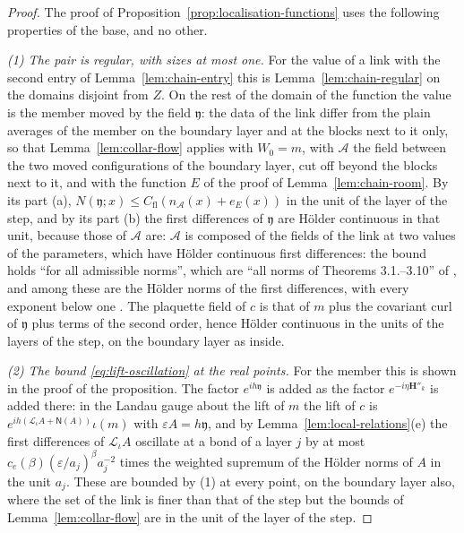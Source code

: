 \begin{proof}
The proof of Proposition~\ref{prop:localisation-functions} uses the following properties of the base, and no other.

\emph{(1) The pair is regular, with sizes at most one.} For the value of a link with the second entry of Lemma~\ref{lem:chain-entry} this is Lemma~\ref{lem:chain-regular} on the domains disjoint from $Z$. On the rest of the domain of the function the value is the member moved by the field $\mathfrak y$: the data of the link differ from the plain averages of the member on the boundary layer and at the blocks next to it only, so that Lemma~\ref{lem:collar-flow} applies with $W_0 = m$, with $\mathcal A$ the field between the two moved configurations of the boundary layer, cut off beyond the blocks next to it, and with the function $E$ of the proof of Lemma~\ref{lem:chain-room}. By its part (a), $N(\mathfrak y; x) \leq C_{\mathrm{fl}}(n_{\mathcal A}(x) + e_E(x))$ in the unit of the layer of the step, and by its part (b) the first differences of $\mathfrak y$ are H\"older continuous in that unit, because those of $\mathcal A$ are: $\mathcal A$ is composed of the fields of the link at two values of the parameters, which have H\"older continuous first differences: the bound \cite[(1.18), p.~6]{BalabanRG2} holds ``for all admissible norms'', which are ``all norms of Theorems 3.1.--3.10'' of \cite{BalabanPBG} \cite[p.~5]{BalabanRG2}, and among these are the H\"older norms \cite[(3.40), p.~397]{BalabanPBG} of the first differences, with every exponent below one \cite[(3.43), p.~398]{BalabanPBG}. The plaquette field of $c$ is that of $m$ plus the covariant curl of $\mathfrak y$ plus terms of the second order, hence H\"older continuous in the units of the layers of the step, on the boundary layer as inside.

\emph{(2) The bound \eqref{eq:lift-oscillation} at the real points.} For the member this is shown in the proof of the proposition. The factor $e^{ih\mathfrak y}$ is added as the factor $e^{-i\eta\mathbf H''_k}$ is added there: in the Landau gauge about the lift of $m$ the lift of $c$ is $e^{ih(\mathcal L_\iota A + \mathsf N(A))}\iota(m)$ with $\varepsilon A = h\mathfrak y$, and by Lemma~\ref{lem:local-relations}(e) the first differences of $\mathcal L_\iota A$ oscillate at a bond of a layer $j$ by at most $c_e(\beta)(\varepsilon/a_j)^\beta a_j^{-2}$ times the weighted supremum of the H\"older norms of $A$ in the unit $a_j$. These are bounded by (1) at every point, on the boundary layer also, where the set of the link is finer than that of the step but the bounds of Lemma~\ref{lem:collar-flow} are in the unit of the layer of the step.


\end{proof}
